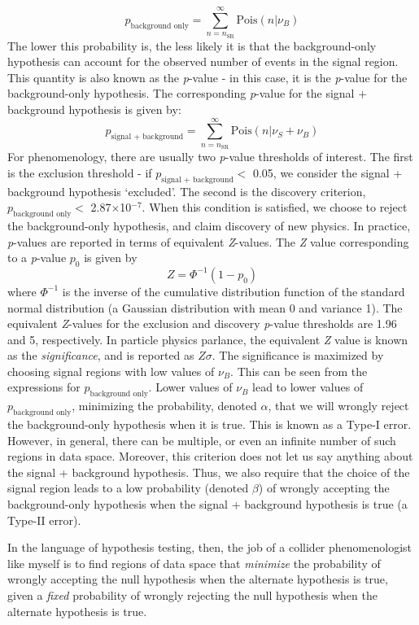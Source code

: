 \[p_\text{background only} = \sum_{n=n_\text{SR}}^\infty \text{Pois}(n|\nu_B)\]
The lower this probability is, the less likely it is that the background-only hypothesis can account for the observed number of events in the signal region. This quantity is also known as the \emph{p}-value - in this case, it is the \emph{p}-value for the background-only hypothesis. The corresponding \emph{p}-value for the signal + background hypothesis is given by:
\[p_\text{signal + background} = \sum_{n=n_\text{SR}}^\infty \text{Pois}(n|\nu_S + \nu_B)\]
For phenomenology, there are usually two \emph{p}-value thresholds of interest. The first is the exclusion threshold - if $p_\text{signal + background} <$ 0.05, we consider the signal + background hypothesis `excluded'. The second is the discovery criterion, $p_\text{background only} <$ 2.87$\times$10$^{-7}$. When this condition is satisfied, we choose to reject the background-only hypothesis, and claim discovery of new physics. In practice, \emph{p}-values are reported in terms of equivalent \emph{Z}-values. The \emph{Z} value corresponding to a \emph{p}-value $p_0$ is given by
\[Z = \Phi^{-1}(1-p_0)\]
where $\Phi^{-1}$ is the inverse of the cumulative distribution function of the standard normal distribution (a Gaussian distribution with mean 0 and variance 1). The equivalent \emph{Z}-values for the exclusion and discovery \emph{p}-value thresholds are 1.96 and 5, respectively. In particle physics parlance, the equivalent \emph{Z} value is known as the \emph{significance}, and is reported as $Z\sigma$.
The significance is maximized by choosing signal regions with low values of $\nu_B$.
This can be seen from the expressions for $p_\text{background only}$. Lower values of $\nu_B$ lead to lower values of $p_\text{background only}$, minimizing the probability, denoted $\alpha$, that we will wrongly reject the background-only hypothesis when it is true. This is known as a Type-I error. However, in general, there can be multiple, or even an infinite number of such regions in data space. Moreover, this criterion does not let us say anything about the signal + background hypothesis. Thus, we also require that the choice of the signal region leads to a low probability (denoted $\beta$) of wrongly accepting the background-only hypothesis when the signal + background hypothesis is true (a Type-II error).

In the language of hypothesis testing, then, the job of a collider phenomenologist like myself is to find regions of data space that \emph{minimize} the probability of wrongly accepting the null hypothesis when the alternate hypothesis is true, given a \emph{fixed} probability of wrongly rejecting the null hypothesis when the alternate hypothesis is true.

